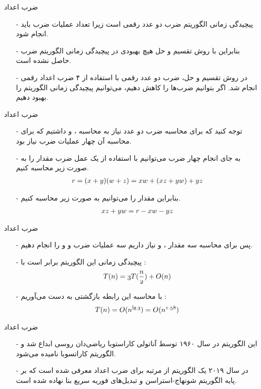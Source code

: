 \begin{frame}{‌ضرب اعداد}
\begin{itemize}\itemr
\item[-]
پیچیدگی زمانی الگوریتم ضرب دو عدد
رقمی
است زیرا تعداد
عملیات ضرب باید انجام شود.
\item[-]
بنابراین با روش تقسیم و حل هیچ بهبودی در پیچیدگی زمانی الگوریتم ضرب حاصل نشده است.
\item[-]
در روش تقسیم و حل، ضرب دو عدد
رقمی با استفاده از ۴ ضرب اعداد
رقمی انجام شد. اگر بتوانیم ضرب‌ها را کاهش دهیم، می‌توانیم پیچیدگی زمانی الگوریتم را بهبود دهیم.
\end{itemize}
\end{frame}


\begin{frame}{‌ضرب اعداد}
\begin{itemize}\itemr
\item[-]
توجه کنید که برای محاسبه ضرب دو عدد نیاز به محاسبه
،
و
داشتیم که برای محاسبه آن چهار عملیات ضرب نیاز بود.
\item[-]
به جای انجام چهار ضرب می‌توانیم با استفاده از یک عمل ضرب مقدار
را به صورت زیر محاسبه کنیم.
\begin{align*}
\mathnormal{r = (x + y)(w + z) = xw + (xz + yw) + yz}
\end{align*}
\item[-]
بنابراین مقدار
را می‌توانیم به صورت زیر محاسبه کنیم.
\begin{align*}
\mathnormal{xz + yw = r - xw - yz}
\end{align*}
\end{itemize}
\end{frame}


\begin{frame}{‌ضرب اعداد}
\begin{itemize}\itemr
\item[-]
پس برای محاسبه سه مقدار
،
و
نیاز داریم سه عملیات ضرب
و
و
را انجام دهیم.
\item[-]
پیچیدگی زمانی این الگوریتم برابر است با :
\begin{align*}
\mathnormal{T(n) = 3T(\frac{n}{2}) + O(n)}
\end{align*}
\item[-]
با محاسبه این رابطه بازگشتی به دست می‌آوریم :
\begin{align*}
\mathnormal{T(n) = O(n^{\lg 3}) = O(n^{1.58})}
\end{align*}
\end{itemize}
\end{frame}


\begin{frame}{‌ضرب اعداد}
\begin{itemize}\itemr
\item[-]
این الگوریتم در سال ۱۹۶۰ توسط آناتولی کاراستوبا
ریاضی‌دان روسی ابداع شد و الگوریتم کاراتسوبا نامیده می‌شود.
\item[-]
در سال ۲۰۱۹ یک الگوریتم از مرتبه
برای ضرب اعداد معرفی شده است که بر پایه الگوریتم شونهاج-استراسن
و تبدیل‌های فوریه سریع بنا نهاده شده است.
\end{itemize}
\end{frame}